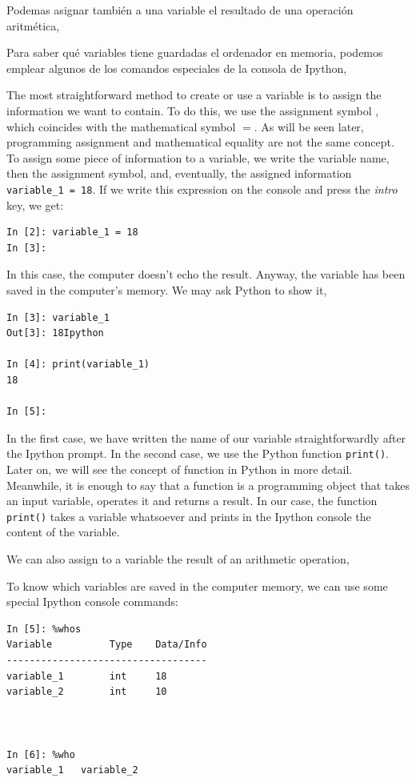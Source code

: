 \begin{paracol}{2}
Podemas asignar también a una variable el resultado de una operación aritmética,

Para saber qué variables tiene guardadas el ordenador en memoria, podemos emplear algunos de los comandos especiales de la consola de Ipython,

\switchcolumn
The most straightforward method to create or use a variable is to assign the information we want to contain. To do this, we use the assignment symbol  , which coincides with the mathematical symbol $=$. As will be seen later, programming assignment and mathematical equality are not the same concept. To assign some piece of information to a variable, we write the variable name, then the assignment symbol, and, eventually, the assigned information \texttt{variable_1 = 18}. If we write this expression on the console and press the \emph{intro} key, we get:
\begin{verbatim}
In [2]: variable_1 = 18
In [3]:
\end{verbatim}
In this case, the computer doesn't echo the result. Anyway,  the variable has been saved in the computer's memory. We may ask Python to show it,

\begin{verbatim}
In [3]: variable_1
Out[3]: 18Ipython

In [4]: print(variable_1)
18

In [5]: 
\end{verbatim}
In the first case, we have written the name of our variable straightforwardly after the Ipython prompt. In the second case,  we use the Python function \texttt{print()}. Later on, we will see the concept of function in Python in more detail. Meanwhile, it is enough to say that a function is a programming object that takes an input variable, operates it and returns a result. In our case, the function \texttt{print()} takes a variable whatsoever and prints in the Ipython console the content of the variable.

We can also assign to a variable the result of an arithmetic operation,

To know which variables are saved in the computer memory, we can use some special Ipython console commands:
\end{paracol}

\begin{center}
\begin{minipage}{0.4\textwidth}
\begin{verbatim}
In [5]: %whos
Variable          Type    Data/Info
-----------------------------------
variable_1        int     18
variable_2        int     10



In [6]: %who
variable_1	 variable_2    
\end{verbatim}
\end{minipage}
\end{center}

